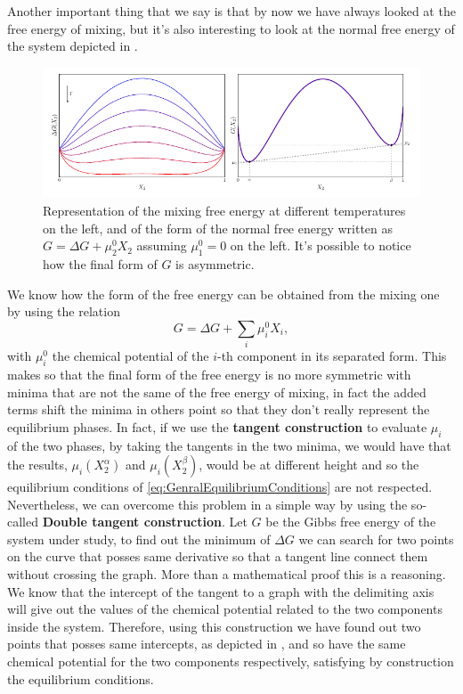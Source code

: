 Another important thing that we say is that by now we have always looked at the free energy of mixing, but it's also interesting to look at the normal free energy of the system depicted in .
\begin{figure}[t]
    \centering
    \includegraphics[width=\textwidth]{Immagini/DoubleTang.pdf}
    \caption
    {
        Representation of the mixing free energy at different temperatures on the left, and of the form of the normal free energy written as $G = \Delta G + \mu^0_2 X_2$ assuming $\mu^0_1 = 0$ on the left. It's possible to notice how the final form of $G$ is asymmetric.
    }
    \label{fig:DoubleTang}
\end{figure}
We know how the form of the free energy can be obtained from the mixing one by using the relation
\begin{equation}
    G = \Delta G + \sum_i \mu_i^0 X_i,
\end{equation}
with $\mu_i^0$ the chemical potential of the $i$-th component in its separated form. This makes so that the final form of the free energy is no more symmetric with minima that are not the same of the free energy of mixing, in fact the added terms shift the minima in others point so that they don't really represent the equilibrium phases. In fact, if we use the \textbf{tangent construction} to evaluate $\mu_i$ of the two phases, by taking the tangents in the two minima, we would have that the results, $\mu_i(X_2^\alpha)$ and $\mu_i(X_2^\beta)$, would be at different height and so the equilibrium conditions of \eqref{eq:GenralEquilibriumConditions} are not respected. Nevertheless, we can overcome this problem in a simple way by using the so-called \textbf{Double tangent construction}. 
{
    Let $G$ be the Gibbs free energy of the system under study, to find out the minimum of $\Delta G$ we can search for two points on the curve that posses same derivative so that a tangent line connect them without crossing the graph.
}
{
    More than a mathematical proof this is a reasoning. We know that the intercept of the tangent to a graph with the delimiting axis will give out the values of the chemical potential related to the two components inside the system. Therefore, using this construction we have found out two points that posses same intercepts, as depicted in , and so have the same chemical potential for the two components respectively, satisfying by construction the equilibrium conditions.
}
